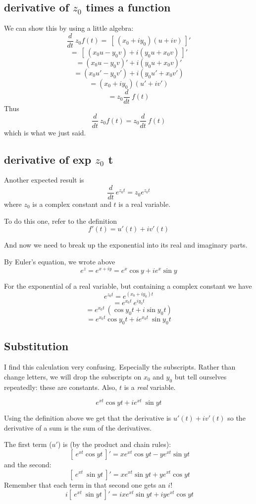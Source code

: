 \documentclass[11pt, oneside]{article}
\begin{document}
\subsection*{derivative of $z_0$ times a function}

We can show this by using a little algebra:
\[ \frac{d}{dt} \ z_0 f(t) = \ [ \ (x_0 + i y_0) (u + iv) \ ]' \]
\[ = \ [ \ (x_0 u - y_0 v) + i (y_0 u + x_0 v) \ ]' \]
\[ = (x_0 u - y_0 v)' + i (y_0 u + x_0 v)' \]
\[ = (x_0 u' - y_0 v') + i (y_0 u' + x_0 v') \]
\[ = (x_0 + i y_0)(u' + iv') \]
\[ = z_0 \frac{d}{dt} \ f(t) \]
Thus
\[ \frac{d}{dt} \ z_0 f(t) = z_0 \frac{d}{dt} \ f(t) \]
which is what we just said.

\subsection*{derivative of exp $z_0$ t }

Another expected result is
\[ \frac{d}{dt} \ e^{z_0 t} = z_0 e^{z_0 t} \]
where $z_0$ is a complex constant and $t$ is a real variable.

To do this one, refer to the definition
\[ f'(t) = u'(t) + i v'(t) \]

And now we need to break up the exponential into its real and imaginary parts.  

By Euler's equation, we wrote above
\[ e^z = e^{x + iy} = e^x \cos y + i e^x \sin y \]

For the exponential of a real variable, but containing a complex constant we have
\[ e^{z_0 t} = e^{(x_0 + iy_0) t} \]
\[ = e^{x_0t} \ e^{i y_0 t} \]
\[ = e^{x_0t} \ (\cos y_0 t + i \sin y_0 t) \]
\[ = e^{x_0t} \cos y_0 t + i e^{x_0t} \ \sin y_0 t \]

\subsection*{Substitution}

I find this calculation very confusing.  Especially the subscripts.  Rather than change letters, we will drop the subscripts on $x_0$ and $y_0$ but tell ourselves repeatedly:  these are constants.  Also, $t$ is a \emph{real} variable.

\[ e^{xt} \cos y t + i e^{xt} \ \sin yt \]

Using the definition above we get that the derivative is $u'(t) + i v'(t)$ so the derivative of a sum is the sum of the derivatives.

The first term ($u'$) is (by the product and chain rules):
\[ \ [ \ e^{xt} \cos y t \ ]' = x e^{xt} \cos yt  - y e^{xt} \sin yt \]
and the second:
\[ \ [ \ e^{xt} \ \sin yt \ ]' =  x e^{xt} \sin yt  + y e^{xt} \cos yt \]
Remember that each term in that second one gets an $i$!
\[ \ i[ \ e^{xt} \ \sin yt \ ]' =  ix e^{xt} \sin yt  + iy e^{xt} \cos yt \]
\end{document}
